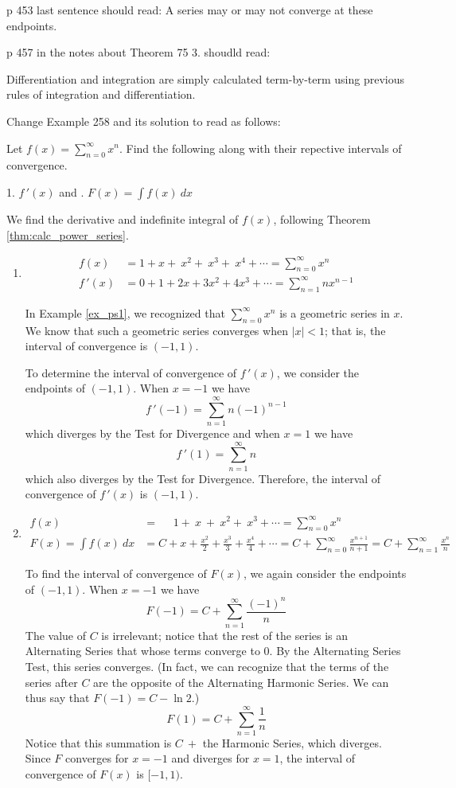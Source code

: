 \documentclass[10pt]{article}
\newcommand{\ds}{\displaystyle}
\newcommand{\fp}{\ensuremath{f\,'}}
\begin{document}
p 453 last sentence should read:
	A series may or may not converge at these endpoints.


p 457 in the notes about Theorem 75 3. shoudld read:

	Differentiation and integration are simply calculated term-by-term using previous rules of integration and differentiation.

Change Example 258 and its solution to read as follows:

{Let $\ds f(x) = \sum_{n=0}^\infty x^n$. Find the following along with their repective intervals of convergence.
\begin{center}
1. $\fp(x)$ \quad and . $\ds F(x) =\int f(x)\ dx$ \end{center}

{We find the derivative and indefinite integral of $f(x)$, following Theorem \ref{thm:calc_power_series}.\\

\begin{enumerate}
\item \begin{align*}
f(x)&=1+x+~x^2+~x^3+~x^4+\cdots = \sum_{n=0}^\infty x^n\\
\fp(x) &= 0+1+2x+3x^2+4x^3+\cdots=\sum_{n=1}^\infty nx^{n-1} 
\end{align*}

In Example \ref{ex_ps1}, we recognized that $\ds \sum_{n=0}^\infty x^n$ is a geometric series in $x$. We know that such a geometric series converges when $|x|<1$; that is, the interval of convergence is $(-1,1)$.

To determine the interval of convergence of $\fp(x)$, we consider the endpoints of $(-1,1)$.
When $x=-1$ we have $$\fp(-1) = \sum_{n=1}^\infty n(-1)^{n-1}$$
which diverges by the Test for Divergence
and when $x=1$ we have
$$\fp(1) = \sum_{n=1}^\infty n$$
which also diverges by the Test for Divergence. Therefore, the interval of convergence of $\fp(x)$ is $(-1,1)$. 

\item  \begin{align*}
f(x)&=~~~~~~1+~x~+~x^2+~x^3+\cdots = \sum_{n=0}^\infty x^n\\
F(x) = \int f(x)\ dx &= C+ x+\frac{x^2}{2}+\frac{x^3}3+\frac{x^4}4+\cdots= C+\sum_{n=0}^\infty \frac{x^{n+1}}{n+1}=C+\sum_{n=1}^\infty \frac{x^{n}}{n}  
\end{align*}

To find the interval of convergence of $F(x)$, we again consider the endpoints of $(-1,1)$.
When $x=-1$ we have
$$F(-1) = C+\sum_{n=1}^\infty \frac{(-1)^{n}}{n}$$
The value of $C$ is irrelevant; notice that the rest of the series is an Alternating Series that whose terms converge to 0. By the Alternating Series Test, this series converges. (In fact, we can recognize that the terms of the series after $C$ are the opposite of the Alternating Harmonic Series. We can thus say that $F(-1) = C-\ln 2$.)
$$F(1) = C+\sum_{n=1}^\infty \frac{1}{n} $$
Notice that this summation is $C\ +$ the Harmonic Series, which diverges. Since $F$ converges for $x=-1$ and diverges for $x=1$, the interval of convergence of $F(x)$ is $[-1,1)$.
\end{enumerate}

}}
\end{document}
